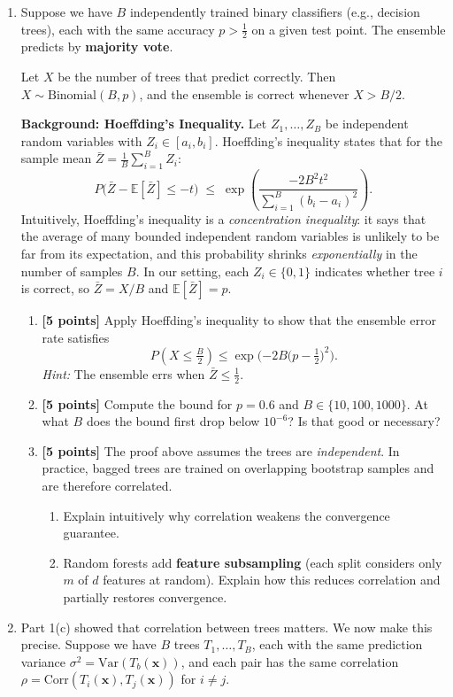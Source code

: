 \documentclass[submit]{../harvardml}
\begin{document}
\begin{problem}

\noindent
\begin{enumerate}
	\item Suppose we have $B$ independently trained binary classifiers (e.g., decision trees), each with the same accuracy $p > \tfrac{1}{2}$ on a given test point. The ensemble predicts by \textbf{majority vote}.

Let $X$ be the number of trees that predict correctly. Then $X \sim \text{Binomial}(B, p)$, and the ensemble is correct whenever $X > B/2$.

\medskip
\noindent
\textbf{Background: Hoeffding's Inequality.}\quad
Let $Z_1, \ldots, Z_B$ be independent random variables with $Z_i \in [a_i, b_i]$. Hoeffding's inequality states that for the sample mean $\bar{Z} = \frac{1}{B}\sum_{i=1}^{B} Z_i$:
\[
P\!\big(\bar{Z} - \mathbb{E}[\bar{Z}] \leq -t\big) \;\leq\; \exp\!\!\left(\frac{-2B^2 t^2}{\sum_{i=1}^{B}(b_i - a_i)^2}\right).
\]
Intuitively, Hoeffding's inequality is a \emph{concentration inequality}: it says that the average of many bounded independent random variables is unlikely to be far from its expectation, and this probability shrinks \emph{exponentially} in the number of samples $B$. In our setting, each $Z_i \in \{0, 1\}$ indicates whether tree $i$ is correct, so $\bar{Z} = X/B$ and $\mathbb{E}[\bar{Z}] = p$.

\begin{enumerate}
    \item \textbf{[5 points]} Apply Hoeffding's inequality to show that the ensemble error rate satisfies
    \[
    P(X \leq \tfrac{B}{2}) \leq \exp\!\Big({-2B\big(p - \tfrac{1}{2}\big)^2}\Big).
    \]
    \emph{Hint:} The ensemble errs when $\bar{Z} \leq \tfrac{1}{2}$. 

    \item \textbf{[5 points]} Compute the bound for $p = 0.6$ and $B \in \{10, 100, 1000\}$. At what $B$ does the bound first drop below $10^{-6}$? Is that good or necessary?

    \item \textbf{[5 points]} The proof above assumes the trees are \emph{independent}. In practice, bagged trees are trained on overlapping bootstrap samples and are therefore correlated.
    \begin{enumerate}
        \item Explain intuitively why correlation weakens the convergence guarantee.
        \item Random forests add \textbf{feature subsampling} (each split considers only $m$ of $d$ features at random). Explain how this reduces correlation and partially restores convergence.
    \end{enumerate}
\end{enumerate}
\item
Part 1(c) showed that correlation between trees matters. We now make this precise. Suppose we have $B$ trees $T_1, \ldots, T_B$, each with the same prediction variance $\sigma^2 = \text{Var}(T_b(\mathbf{x}))$, and each pair has the same correlation $\rho = \text{Corr}(T_i(\mathbf{x}), T_j(\mathbf{x}))$ for $i \neq j$.


\end{enumerate}
\end{problem}
\end{document}
